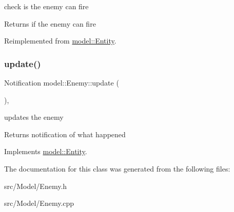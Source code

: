 check is the enemy can fire 

\begin{DoxyReturn}{Returns}
if the enemy can fire 
\end{DoxyReturn}


Reimplemented from \mbox{\hyperlink{classmodel_1_1_entity}{model\+::\+Entity}}.

\mbox{\label{classmodel_1_1_enemy_ad94553dfee4e98ca717428d649274055}} 
\subsubsection{\texorpdfstring{update()}{update()}}
{\footnotesize\ttfamily Notification model\+::\+Enemy\+::update (\begin{DoxyParamCaption}{ }\end{DoxyParamCaption})\hspace{0.3cm}{\ttfamily [override]}, {\ttfamily [virtual]}}



updates the enemy 

\begin{DoxyReturn}{Returns}
notification of what happened 
\end{DoxyReturn}


Implements \mbox{\hyperlink{classmodel_1_1_entity}{model\+::\+Entity}}.



The documentation for this class was generated from the following files\+:\begin{DoxyCompactItemize}
\item 
src/\+Model/Enemy.\+h\item 
src/\+Model/Enemy.\+cpp\end{DoxyCompactItemize}
